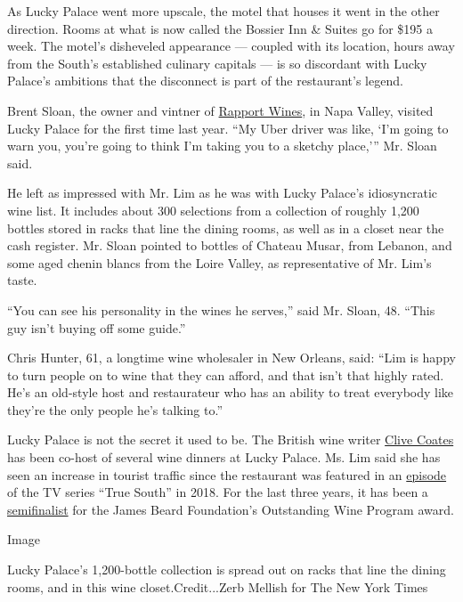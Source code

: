 As Lucky Palace went more upscale, the motel that houses it went in the
other direction. Rooms at what is now called the Bossier Inn \& Suites
go for \$195 a week. The motel's disheveled appearance --- coupled with
its location, hours away from the South's established culinary capitals
--- is so discordant with Lucky Palace's ambitions that the disconnect
is part of the restaurant's legend.

Brent Sloan, the owner and vintner of
\href{https://rapportwines.com/}{Rapport Wines}, in Napa Valley, visited
Lucky Palace for the first time last year. ``My Uber driver was like,
`I'm going to warn you, you're going to think I'm taking you to a
sketchy place,''' Mr. Sloan said.

He left as impressed with Mr. Lim as he was with Lucky Palace's
idiosyncratic wine list. It includes about 300 selections from a
collection of roughly 1,200 bottles stored in racks that line the dining
rooms, as well as in a closet near the cash register. Mr. Sloan pointed
to bottles of Chateau Musar, from Lebanon, and some aged chenin blancs
from the Loire Valley, as representative of Mr. Lim's taste.

``You can see his personality in the wines he serves,'' said Mr. Sloan,
48. ``This guy isn't buying off some guide.''

Chris Hunter, 61, a longtime wine wholesaler in New Orleans, said: ``Lim
is happy to turn people on to wine that they can afford, and that isn't
that highly rated. He's an old-style host and restaurateur who has an
ability to treat everybody like they're the only people he's talking
to.''

Lucky Palace is not the secret it used to be. The British wine writer
\href{http://www.clive-coates.com/}{Clive Coates} has been co-host of
several wine dinners at Lucky Palace. Ms. Lim said she has seen an
increase in tourist traffic since the restaurant was featured in an
\href{https://www.shreveporttimes.com/story/money/business/2018/09/14/sec-network-feature-shreveport-bossier-restaurants/37807111/}{episode}
of the TV series ``True South'' in 2018. For the last three years, it
has been a
\href{https://www.shreveporttimes.com/story/entertainment/dining/2020/02/27/lucky-palace-bossier-city-makes-james-beard-awards-semifinals/4883334002/}{semifinalist}
for the James Beard Foundation's Outstanding Wine Program award.

Image

Lucky Palace's 1,200-bottle collection is spread out on racks that line
the dining rooms, and in this wine closet.Credit...Zerb Mellish for The
New York Times

